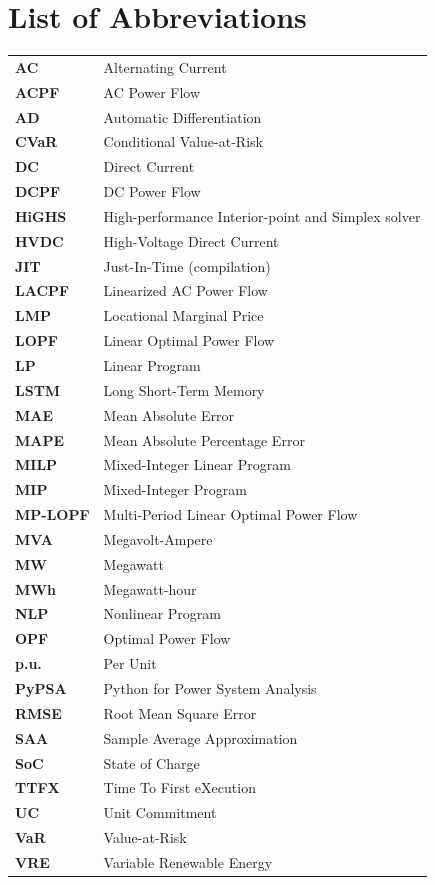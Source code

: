 \chapter*{List of Abbreviations}

\begin{tabular}{ll}
\textbf{AC}     & Alternating Current \\
\textbf{ACPF}   & AC Power Flow \\
\textbf{AD}     & Automatic Differentiation \\
\textbf{CVaR}   & Conditional Value-at-Risk \\
\textbf{DC}     & Direct Current \\
\textbf{DCPF}   & DC Power Flow \\
\textbf{HiGHS}  & High-performance Interior-point and Simplex solver \\
\textbf{HVDC}   & High-Voltage Direct Current \\
\textbf{JIT}    & Just-In-Time (compilation) \\
\textbf{LACPF}  & Linearized AC Power Flow \\
\textbf{LMP}    & Locational Marginal Price \\
\textbf{LOPF}   & Linear Optimal Power Flow \\
\textbf{LP}     & Linear Program \\
\textbf{LSTM}   & Long Short-Term Memory \\
\textbf{MAE}    & Mean Absolute Error \\
\textbf{MAPE}   & Mean Absolute Percentage Error \\
\textbf{MILP}   & Mixed-Integer Linear Program \\
\textbf{MIP}    & Mixed-Integer Program \\
\textbf{MP-LOPF} & Multi-Period Linear Optimal Power Flow \\
\textbf{MVA}    & Megavolt-Ampere \\
\textbf{MW}     & Megawatt \\
\textbf{MWh}    & Megawatt-hour \\
\textbf{NLP}    & Nonlinear Program \\
\textbf{OPF}    & Optimal Power Flow \\
\textbf{p.u.}   & Per Unit \\
\textbf{PyPSA}  & Python for Power System Analysis \\
\textbf{RMSE}   & Root Mean Square Error \\
\textbf{SAA}    & Sample Average Approximation \\
\textbf{SoC}    & State of Charge \\
\textbf{TTFX}   & Time To First eXecution \\
\textbf{UC}     & Unit Commitment \\
\textbf{VaR}    & Value-at-Risk \\
\textbf{VRE}    & Variable Renewable Energy \\
\end{tabular}
